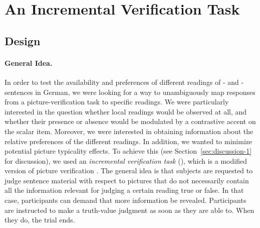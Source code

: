 \documentclass[fleqn,reqno,10pt]{article}
\newcommand{\as}{\acro{as}}
\renewcommand{\es}{\acro{es}}
\begin{document}
\section{An Incremental Verification Task}
\label{sec:exp}

\subsection{Design}
\label{sec:design}

\paragraph{General Idea.} In order to test the availability and
preferences of different readings of \as- and \es-sentences in German,
we were looking for a way to unambiguously map responses from a
picture-verification task to specific readings. We were particularly
interested in the question whether local readings would be observed at
all, and whether their presence or absence would be modulated by a
contrastive accent on the scalar item. Moreover, we were interested in
obtaining information about the relative preferences of the different
readings. In addition, we wanted to minimize potential picture
typicality effects. To achieve this (see
Section~\ref{sec:discussion-1} for discussion), we used an
\emph{incremental verification task} (), which is a
modified version of picture verification
\citep[see][]{Conroy2008}. The general idea is that subjects are
requested to judge sentence material with respect to pictures that do
not necessarily contain all the information relevant for judging a
certain reading true or false. In that case, participants can demand
that more information be revealed. Participants are instructed to make
a truth-value judgment as soon as they are able to. When they do, the
trial ends.
\end{document}
